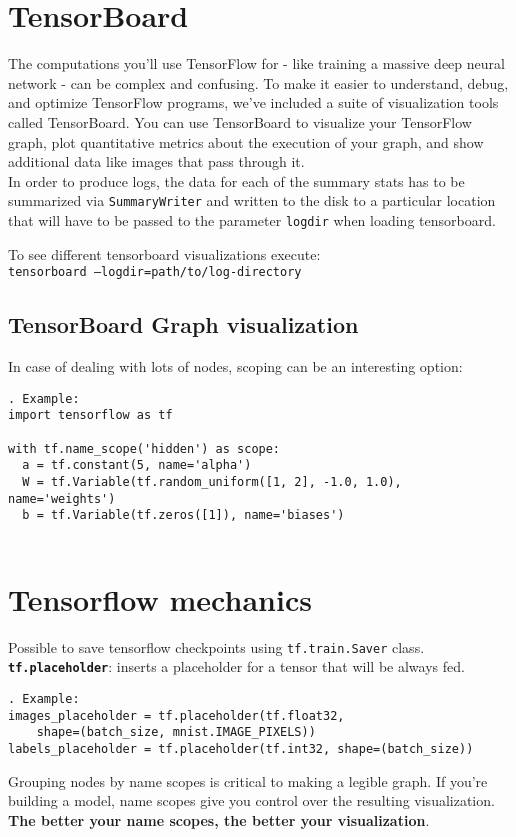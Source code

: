 \documentclass[11pt,a4paper]{article}
\begin{document}
\section{TensorBoard}
The computations you'll use TensorFlow for - like training a massive deep neural network - can be complex and confusing. To make it easier to understand, debug, and optimize TensorFlow programs, we've included a suite of visualization tools called TensorBoard. You can use TensorBoard to visualize your TensorFlow graph, plot quantitative metrics about the execution of your graph, and show additional data like images that pass through it. \\
In order to produce logs, the data for each of the summary stats has to be summarized via \texttt{SummaryWriter} and written to the disk to a particular location that will have to be passed to the parameter \texttt{logdir} when loading tensorboard. 

To see different tensorboard  visualizations execute: \\ 
\texttt{tensorboard --logdir=path/to/log-directory}

\subsection{TensorBoard Graph visualization}
In case of dealing with lots of nodes, scoping can be an interesting option: 
\begin{lstlisting}. Example: 
import tensorflow as tf

with tf.name_scope('hidden') as scope:
  a = tf.constant(5, name='alpha')
  W = tf.Variable(tf.random_uniform([1, 2], -1.0, 1.0), name='weights')
  b = tf.Variable(tf.zeros([1]), name='biases')
  
  \end{lstlisting} 
\section{Tensorflow mechanics}
Possible to save tensorflow checkpoints using \texttt{tf.train.Saver} class.\\
\textbf{\texttt{tf.placeholder}}: inserts a placeholder for a tensor that will be always fed. 
\begin{lstlisting}. Example: 
images_placeholder = tf.placeholder(tf.float32, 
	shape=(batch_size, mnist.IMAGE_PIXELS))
labels_placeholder = tf.placeholder(tf.int32, shape=(batch_size))
\end{lstlisting}
Grouping nodes by name scopes is critical to making a legible graph. If you're building a model, name scopes give you control over the resulting visualization. \textbf{The better your name scopes, the better your visualization}.
\end{document}
